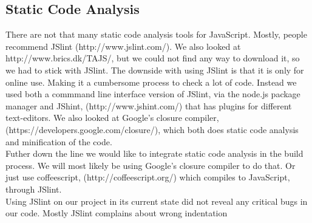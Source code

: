 \subsection{Static Code Analysis} %
\label{sub:Static Code Analysis}
There are not that many static code analysis tools for JavaScript. Mostly, people recommend JSlint (http://www.jslint.com/). We also looked at http://www.brics.dk/TAJS/, but we could not find any way to download it, so we had to stick with JSlint. The downside with using JSlint is that it is only for online use. Making it a cumbersome process to check a lot of code. 
Instead we used both a commmand line interface version of JSlint, via the node.js package manager and JShint, (http://www.jshint.com/) that has plugins for different text-editors. We also looked at Google's closure compiler, (https://developers.google.com/closure/), which both does static code analysis and minification of the code.\\
Futher down the line we would like to integrate static code analysis in the build process. We will most likely be using Google's closure compiler to do that. Or just use coffeescript, (http://coffeescript.org/) which compiles to JavaScript, through JSlint.\\
Using JSlint on our project in its current state did not reveal any critical bugs in our code. Mostly JSlint complains about wrong indentation

